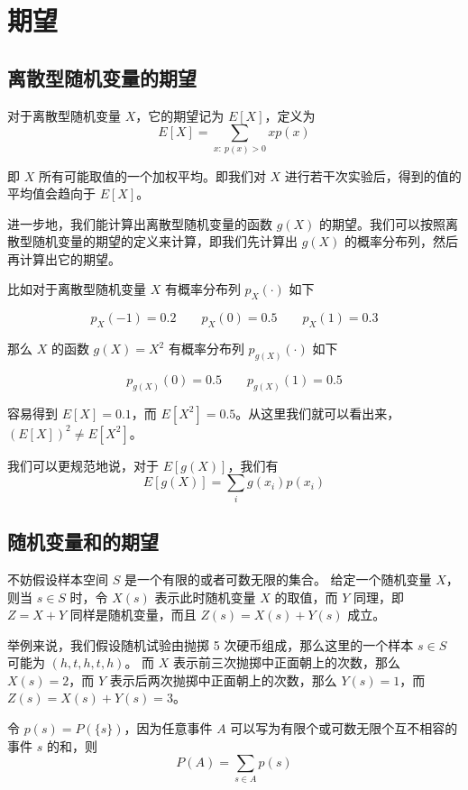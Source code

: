 \documentclass[utf8,a4paper,nofonts,9pt]{ctexbook}
\begin{document}
\section{期望}


\subsection{离散型随机变量的期望}

对于离散型随机变量 $X$，它的期望记为 $E[X]$，定义为
\[
    E[X] = \sum_{x:\ p(x) > 0} x p(x)
\]

即 $X$ 所有可能取值的一个加权平均。即我们对 $X$ 进行若干次实验后，得到的值的平均值会趋向于 $E[X]$。

进一步地，我们能计算出离散型随机变量的函数 $g(X)$ 的期望。我们可以按照离散型随机变量的期望的定义来计算，即我们先计算出 $g(X)$ 的概率分布列，然后再计算出它的期望。

\begin{exampleBox}
    比如对于离散型随机变量 $X$ 有概率分布列 $p_X( \cdot )$ 如下

    \[
        p_X(-1) = 0.2 \qquad p_X(0) = 0.5 \qquad p_X(1) = 0.3
    \]

    那么 $X$ 的函数 $g(X) = X^2$ 有概率分布列 $p_{g(X)}( \cdot )$ 如下

    \[
        p_{g(X)}(0) = 0.5 \qquad p_{g(X)}(1) = 0.5
    \]

    容易得到 $E[X] = 0.1$，而 $E[X^2] = 0.5$。从这里我们就可以看出来，$(E[X])^2 \ne E[X^2]$。
\end{exampleBox}

我们可以更规范地说，对于 $E[g(X)]$，我们有
\[
    E[g(X)] = \sum_{i} g(x_i) p(x_i)
\]


\subsection{随机变量和的期望}

不妨假设样本空间 $S$ 是一个有限的或者可数无限的集合。
给定一个随机变量 $X$，则当 $s \in S$ 时，令 $X(s)$ 表示此时随机变量 $X$ 的取值，而 $Y$ 同理，即 $Z = X + Y$ 同样是随机变量，而且 $Z(s) = X(s) + Y(s)$ 成立。

举例来说，我们假设随机试验由抛掷 5 次硬币组成，那么这里的一个样本 $s \in S$ 可能为 $(h, t, h, t, h)$。
而 $X$ 表示前三次抛掷中正面朝上的次数，那么 $X(s) = 2$，而 $Y$ 表示后两次抛掷中正面朝上的次数，那么 $Y(s) = 1$，而 $Z(s) = X(s) + Y(s) = 3$。

令 $p(s) = P(\{ s \})$，因为任意事件 $A$ 可以写为有限个或可数无限个互不相容的事件 $s$ 的和，则
\[
    P(A) = \sum_{s \in A} p(s)
\]
\end{document}
